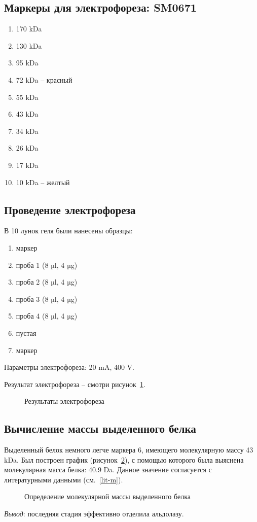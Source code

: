 
\subsection{Маркеры для электрофореза: SM0671}
\begin{enumerate}
\item 170 kDa
\item 130 kDa
\item 95 kDa
\item 72 kDa -- красный
\item 55 kDa
\item 43 kDa
\item 34 kDa
\item 26 kDa
\item 17 kDa
\item 10 kDa -- желтый
\end{enumerate}

\subsection{Проведение электрофореза}
В 10 лунок геля были нанесены образцы:
\begin{enumerate}
\item маркер
\item проба 1 (8 µl, 4 µg)
\item проба 2 (8 µl, 4 µg)
\item проба 3 (8 µl, 4 µg)
\item проба 4 (8 µl, 4 µg)
\item пустая
\item маркер
\end{enumerate}

Параметры электрофореза: 20 mA, 400 V.

Результат электрофореза -- смотри рисунок~\ref{fig-ef-result}.

\begin{figure}[htbp]
\def\svgwidth{0.7\linewidth}
\caption{Результаты электрофореза}
\label{fig-ef-result}
\end{figure}

\subsection{Вычисление массы выделенного белка}
Выделенный белок немного легче маркера 6, имеющего молекулярную массу 43 kDa.
Был построен график (рисунок~\ref{fig-ef-m}),
с помощью которого была выяснена молекулярная масса белка: 40.9 Da.
Данное значение согласуется с литературными данными (см.~\ref{lit-m}).

\begin{figure}[htbp]

\caption{Определение молекулярной массы выделенного белка}
\label{fig-ef-m}
\end{figure}

\emph{Вывод}: последняя стадия эффективно отделила альдолазу.

